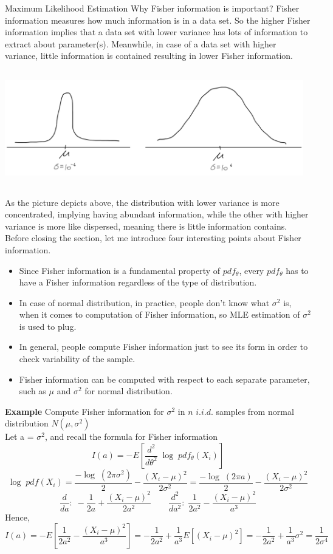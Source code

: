 \documentclass[12pt]{article}
\begin{document}
\begin{section}{Maximum Likelihood Estimation}
Why Fisher information is important? Fisher information measures how much information is in a data set. So the higher Fisher information implies that a data set with lower variance has lots of information to extract about parameter(s). Meanwhile, in case of a data set with
higher variance, little information is contained resulting in lower Fisher information.

\includegraphics[height=5cm, width=13cm]{image_mle.png}

As the picture depicts above, the distribution with lower variance is more concentrated, implying having abundant information, while the other with higher variance is more like dispersed, meaning there is little information contains.\\

Before closing the section, let me introduce four interesting points about Fisher information.
\begin{itemize}
  \item Since Fisher information is a fundamental property of $pdf_\theta$, every $pdf_\theta$ has to have a Fisher information regardless of the type of distribution. 
  \item In case of normal distribution, in practice, people don't know what $\sigma^2$ is, when it comes to computation of Fisher information, so MLE estimation of $\sigma^2$ is used to plug.
  \item In general, people compute Fisher information just to see its form in order to check variability of the sample.
  \item Fisher information can be computed with respect to each separate parameter, such as $\mu$ and $\sigma^2$ for normal distribution. 
\end{itemize}

\textbf{Example} \quad Compute Fisher information for $\sigma^2$ in $n$ $i.i.d.$ samples from normal distribution $N(\mu, \sigma^2)$\\

Let a = $\sigma^2$, and recall the formula for Fisher information
$$I(a) = -E\left[\frac{d^2}{d\theta^2}\;\log\;pdf_\theta (X_i)\right]$$
$$\log \; pdf(X_i) = \frac{-\log\;(2\pi\sigma^2)}{2} - \frac{(X_i-\mu)^2}{2\sigma^2} = \frac{-\log\;(2\pi a)}{2} - \frac{(X_i-\mu)^2}{2\sigma^2}$$
$$\frac{d}{da}: \; -\frac{1}{2a} + \frac{(X_i-\mu)^2}{2a^2} \qquad \frac{d^2}{da^2}: \; \frac{1}{2a^2} - \frac{(X_i-\mu)^2}{a^3}$$
Hence, 
$$I(a) = -E\left[\frac{1}{2a^2} - \frac{(X_i-\mu)^2}{a^3}\right] = -\frac{1}{2a^2} + \frac{1}{a^3}E[(X_i - \mu)^2] = -\frac{1}{2a^2} + \frac{1}{a^3}{\sigma^2} = \frac{1}{2\sigma^4}$$


\end{section}
\end{document}
